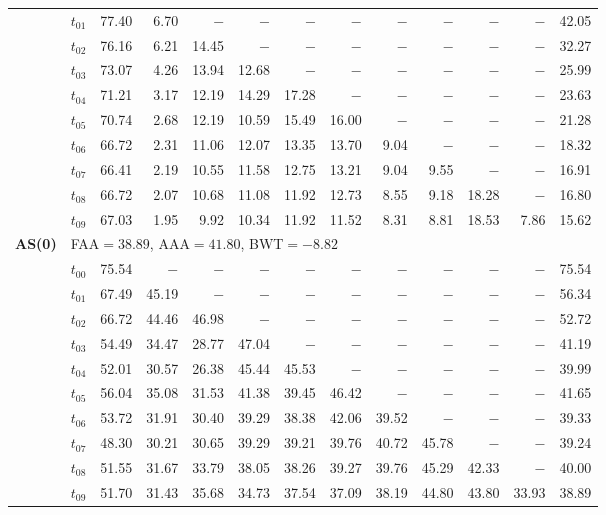 \begin{table}[ht]
\begin{tabular}{@{}l l r r r r r r r r r r r@{}}
 & $t_{01}$ & 77.40 & 6.70 & $-$ & $-$ & $-$ & $-$ & $-$ & $-$ & $-$ & $-$ & 42.05 \\
 & $t_{02}$ & 76.16 & 6.21 & 14.45 & $-$ & $-$ & $-$ & $-$ & $-$ & $-$ & $-$ & 32.27 \\
 & $t_{03}$ & 73.07 & 4.26 & 13.94 & 12.68 & $-$ & $-$ & $-$ & $-$ & $-$ & $-$ & 25.99 \\
 & $t_{04}$ & 71.21 & 3.17 & 12.19 & 14.29 & 17.28 & $-$ & $-$ & $-$ & $-$ & $-$ & 23.63 \\
 & $t_{05}$ & 70.74 & 2.68 & 12.19 & 10.59 & 15.49 & 16.00 & $-$ & $-$ & $-$ & $-$ & 21.28 \\
 & $t_{06}$ & 66.72 & 2.31 & 11.06 & 12.07 & 13.35 & 13.70 & 9.04 & $-$ & $-$ & $-$ & 18.32 \\
 & $t_{07}$ & 66.41 & 2.19 & 10.55 & 11.58 & 12.75 & 13.21 & 9.04 & 9.55 & $-$ & $-$ & 16.91 \\
 & $t_{08}$ & 66.72 & 2.07 & 10.68 & 11.08 & 11.92 & 12.73 & 8.55 & 9.18 & 18.28 & $-$ & 16.80 \\
 & $t_{09}$ & 67.03 & 1.95 & 9.92 & 10.34 & 11.92 & 11.52 & 8.31 & 8.81 & 18.53 & 7.86 & 15.62 \\
\midrule
\multirow{11}{*}{\textbf{AS(0)}} & \multicolumn{12}{l}{\quad\small FAA$=38.89$,\; AAA$=41.80$,\; BWT$=-8.82$} \\
 & $t_{00}$ & 75.54 & $-$ & $-$ & $-$ & $-$ & $-$ & $-$ & $-$ & $-$ & $-$ & 75.54 \\
 & $t_{01}$ & 67.49 & 45.19 & $-$ & $-$ & $-$ & $-$ & $-$ & $-$ & $-$ & $-$ & 56.34 \\
 & $t_{02}$ & 66.72 & 44.46 & 46.98 & $-$ & $-$ & $-$ & $-$ & $-$ & $-$ & $-$ & 52.72 \\
 & $t_{03}$ & 54.49 & 34.47 & 28.77 & 47.04 & $-$ & $-$ & $-$ & $-$ & $-$ & $-$ & 41.19 \\
 & $t_{04}$ & 52.01 & 30.57 & 26.38 & 45.44 & 45.53 & $-$ & $-$ & $-$ & $-$ & $-$ & 39.99 \\
 & $t_{05}$ & 56.04 & 35.08 & 31.53 & 41.38 & 39.45 & 46.42 & $-$ & $-$ & $-$ & $-$ & 41.65 \\
 & $t_{06}$ & 53.72 & 31.91 & 30.40 & 39.29 & 38.38 & 42.06 & 39.52 & $-$ & $-$ & $-$ & 39.33 \\
 & $t_{07}$ & 48.30 & 30.21 & 30.65 & 39.29 & 39.21 & 39.76 & 40.72 & 45.78 & $-$ & $-$ & 39.24 \\
 & $t_{08}$ & 51.55 & 31.67 & 33.79 & 38.05 & 38.26 & 39.27 & 39.76 & 45.29 & 42.33 & $-$ & 40.00 \\
 & $t_{09}$ & 51.70 & 31.43 & 35.68 & 34.73 & 37.54 & 37.09 & 38.19 & 44.80 & 43.80 & 33.93 & 38.89 \\

\end{tabular}
\end{table}

